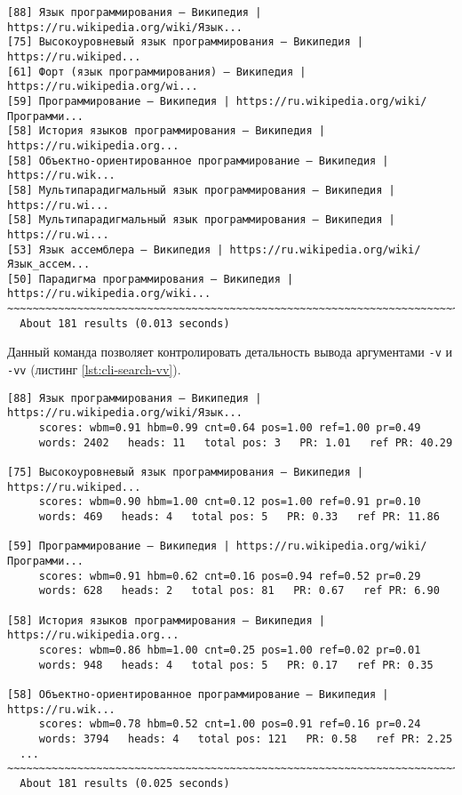 \begin{lstlisting}[caption=Интерфейс командной строки: поиск., label=lst:cli-search]
[88] Язык программирования — Википедия | https://ru.wikipedia.org/wiki/Язык...
[75] Высокоуровневый язык программирования — Википедия | https://ru.wikiped...
[61] Форт (язык программирования) — Википедия | https://ru.wikipedia.org/wi...
[59] Программирование — Википедия | https://ru.wikipedia.org/wiki/Программи...
[58] История языков программирования — Википедия | https://ru.wikipedia.org...
[58] Объектно-ориентированное программирование — Википедия | https://ru.wik...
[58] Мультипарадигмальный язык программирования — Википедия | https://ru.wi...
[58] Мультипарадигмальный язык программирования — Википедия | https://ru.wi...
[53] Язык ассемблера — Википедия | https://ru.wikipedia.org/wiki/Язык_ассем...
[50] Парадигма программирования — Википедия | https://ru.wikipedia.org/wiki...
~~~~~~~~~~~~~~~~~~~~~~~~~~~~~~~~~~~~~~~~~~~~~~~~~~~~~~~~~~~~~~~~~~~~~~~~~~~~~~
  About 181 results (0.013 seconds)
\end{lstlisting}

Данный команда позволяет контролировать детальность вывода аргументами \verb|-v| и \verb|-vv| (листинг \ref{lst:cli-search-vv}).
\begin{lstlisting}[caption=Интерфейс командной строки: поиск., label=lst:cli-search-vv]
[88] Язык программирования — Википедия | https://ru.wikipedia.org/wiki/Язык...
     scores: wbm=0.91 hbm=0.99 cnt=0.64 pos=1.00 ref=1.00 pr=0.49
     words: 2402   heads: 11   total pos: 3   PR: 1.01   ref PR: 40.29

[75] Высокоуровневый язык программирования — Википедия | https://ru.wikiped...
     scores: wbm=0.90 hbm=1.00 cnt=0.12 pos=1.00 ref=0.91 pr=0.10
     words: 469   heads: 4   total pos: 5   PR: 0.33   ref PR: 11.86

[59] Программирование — Википедия | https://ru.wikipedia.org/wiki/Программи...
     scores: wbm=0.91 hbm=0.62 cnt=0.16 pos=0.94 ref=0.52 pr=0.29
     words: 628   heads: 2   total pos: 81   PR: 0.67   ref PR: 6.90

[58] История языков программирования — Википедия | https://ru.wikipedia.org...
     scores: wbm=0.86 hbm=1.00 cnt=0.25 pos=1.00 ref=0.02 pr=0.01
     words: 948   heads: 4   total pos: 5   PR: 0.17   ref PR: 0.35

[58] Объектно-ориентированное программирование — Википедия | https://ru.wik...
     scores: wbm=0.78 hbm=0.52 cnt=1.00 pos=0.91 ref=0.16 pr=0.24
     words: 3794   heads: 4   total pos: 121   PR: 0.58   ref PR: 2.25
  ...
~~~~~~~~~~~~~~~~~~~~~~~~~~~~~~~~~~~~~~~~~~~~~~~~~~~~~~~~~~~~~~~~~~~~~~~~~~~~~~
  About 181 results (0.025 seconds)
\end{lstlisting}
